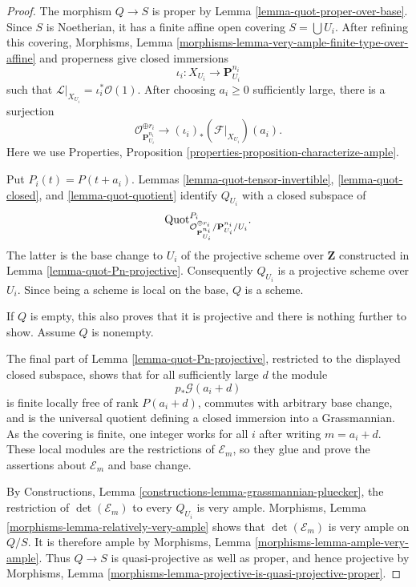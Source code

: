 \begin{proof}
The morphism $Q \to S$ is proper by
Lemma \ref{lemma-quot-proper-over-base}. Since $S$ is Noetherian, it has
a finite affine open covering $S = \bigcup U_i$. After refining this
covering, Morphisms, Lemma
\ref{morphisms-lemma-very-ample-finite-type-over-affine} and properness
give closed immersions
$$
\iota_i : X_{U_i} \longrightarrow \mathbf{P}^{n_i}_{U_i}
$$
such that $\mathcal{L}|_{X_{U_i}} = \iota_i^*\mathcal{O}(1)$. After
choosing $a_i \geq 0$ sufficiently large, there is a surjection
$$
\mathcal{O}_{\mathbf{P}^{n_i}_{U_i}}^{\oplus r_i}
\longrightarrow (\iota_i)_*(\mathcal{F}|_{X_{U_i}})(a_i).
$$
Here we use Properties, Proposition
\ref{properties-proposition-characterize-ample}.

Put $P_i(t) = P(t + a_i)$. Lemmas
\ref{lemma-quot-tensor-invertible}, \ref{lemma-quot-closed}, and
\ref{lemma-quot-quotient} identify $Q_{U_i}$ with a closed subspace of
$$
\mathrm{Quot}^{P_i}_{
\mathcal{O}^{\oplus r_i}_{\mathbf{P}^{n_i}_{U_i}}/
\mathbf{P}^{n_i}_{U_i}/U_i}.
$$
The latter is the base change to $U_i$ of the projective scheme over
$\mathbf{Z}$ constructed in Lemma \ref{lemma-quot-Pn-projective}.
Consequently $Q_{U_i}$ is a projective scheme over $U_i$. Since being a
scheme is local on the base, $Q$ is a scheme.

If $Q$ is empty, this also proves that it is projective and there is
nothing further to show. Assume $Q$ is nonempty.

The final part of Lemma \ref{lemma-quot-Pn-projective}, restricted to
the displayed closed subspace, shows that for all sufficiently large
$d$ the module
$$
p_*\mathcal{G}(a_i + d)
$$
is finite locally free of rank $P(a_i + d)$, commutes with arbitrary
base change, and is the universal quotient defining a closed immersion
into a Grassmannian. As the covering is finite, one integer works for
all $i$ after writing $m = a_i + d$. These local modules are the
restrictions of $\mathcal{E}_m$, so they glue and prove the assertions
about $\mathcal{E}_m$ and base change.

By Constructions, Lemma
\ref{constructions-lemma-grassmannian-pluecker}, the restriction of
$\det(\mathcal{E}_m)$ to every $Q_{U_i}$ is very ample. Morphisms,
Lemma \ref{morphisms-lemma-relatively-very-ample} shows that
$\det(\mathcal{E}_m)$ is very ample on $Q/S$. It is therefore ample by
Morphisms, Lemma \ref{morphisms-lemma-ample-very-ample}. Thus $Q \to S$
is quasi-projective as well as proper, and hence projective by
Morphisms, Lemma
\ref{morphisms-lemma-projective-is-quasi-projective-proper}.
\end{proof}

